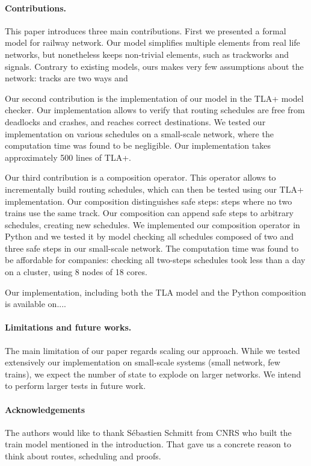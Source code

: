 \documentclass[runningheads]{llncs}
\begin{document}
\paragraph{Contributions.}
This paper introduces three main contributions. First we presented a formal model for railway network. Our model simplifies multiple elements from real life networks, but nonetheless keeps non-trivial elements, such as trackworks and signals. Contrary to existing models, ours makes very few assumptions about the network: tracks are two ways and 

Our second contribution is the implementation of our model in the TLA+ model checker. Our implementation allows to verify that routing schedules are free from deadlocks and crashes, and reaches correct destinations. We tested our implementation on various schedules on a small-scale network, where the computation time was found to be negligible. Our implementation takes approximately 500 lines of TLA+.

Our third contribution is a composition operator. This operator allows to incrementally build routing schedules, which can then be tested using our TLA+ implementation. Our composition distinguishes safe steps: steps where no two trains use the same track. Our composition can append safe steps to arbitrary schedules, creating new schedules. We implemented our composition operator in Python and we tested it by model checking all schedules composed of two and three safe steps in our small-scale network. The computation time was found to be affordable for companies: checking all two-steps schedules took less than a day on a cluster, using 8 nodes of 18 cores.

Our implementation, including both the TLA model and the Python composition is available on....

\paragraph{Limitations and future works.}
The main limitation of our paper regards scaling our approach. While we tested extensively our implementation on small-scale systems (small network, few trains), we expect the number of state to explode on larger networks. We intend to perform larger tests in future work.


\paragraph{Acknowledgements} The authors would like to thank Sébastien Schmitt from CNRS who built the train model mentioned in the introduction. That gave us a concrete reason to think about routes, scheduling and proofs. 



\end{document}
